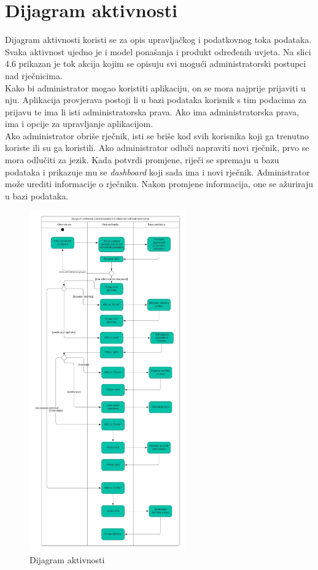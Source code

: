 		\section{Dijagram aktivnosti}
        Dijagram aktivnosti koristi se za opis upravljačkog i podatkovnog toka podataka. Svaka aktivnost ujedno je i model ponašanja i produkt određenih uvjeta. Na slici 4.6 prikazan je tok akcija kojim se opisuju svi mogući administratorski postupci nad rječnicima. \newline
        \\
        Kako bi administrator mogao koristiti aplikaciju, on se mora najprije prijaviti u nju. Aplikacija provjerava postoji li u bazi podataka korisnik s tim podacima za prijavu te ima li isti administratorska prava.
        Ako ima administratorska prava, ima i opcije za upravljanje aplikacijom.
        \newline
        \\
         Ako administrator obriše rječnik, isti se briše kod svih korisnika koji ga trenutno koriste ili su ga koristili. Ako administrator odluči napraviti novi rječnik, prvo se mora odlučiti za jezik. Kada potvrdi promjene, riječi se spremaju u bazu podataka i prikazuje mu se  \textit{dashboard} koji sada ima i novi rječnik. Administrator može urediti informacije o rječniku. Nakon promjene informacija, one se ažuriraju u bazi podataka.
        \begin{figure}[H]
            \includegraphics[width=0.6\textwidth]{dijagrami/Dijagram Aktivnosti.png} 
            \centering
            \caption{Dijagram aktivnosti}
            \label{fig:class_diagram}
        \end{figure}	

